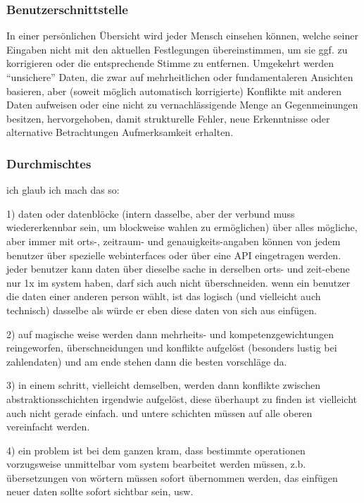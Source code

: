\subsubsection{Benutzerschnittstelle}

In einer persönlichen Übersicht wird jeder Mensch einsehen können, welche seiner Eingaben nicht mit den aktuellen Festlegungen übereinstimmen, um sie ggf. zu korrigieren oder die entsprechende Stimme zu entfernen. Umgekehrt werden "`unsichere"' Daten, die zwar auf mehrheitlichen oder fundamentaleren Ansichten basieren, aber (soweit möglich automatisch korrigierte) Konflikte mit anderen Daten aufweisen oder eine nicht zu vernachlässigende Menge an Gegenmeinungen besitzen, hervorgehoben, damit strukturelle Fehler, neue Erkenntnisse oder alternative Betrachtungen Aufmerksamkeit erhalten.

\subsubsection{Durchmischtes}

ich glaub ich mach das so:

1) daten oder datenblöcke (intern dasselbe, aber der verbund muss wiedererkennbar sein, um blockweise wahlen zu ermöglichen) über alles mögliche, aber immer mit orts-, zeitraum- und genauigkeits-angaben können von jedem benutzer über spezielle webinterfaces oder über eine API eingetragen werden. jeder benutzer kann daten über dieselbe sache in derselben orts- und zeit-ebene nur 1x im system haben, darf sich auch nicht überschneiden. wenn ein benutzer die daten einer anderen person wählt, ist das logisch (und vielleicht auch technisch) dasselbe als würde er eben diese daten von sich aus einfügen.

2) auf magische weise werden dann mehrheits- und kompetenzgewichtungen reingeworfen, überschneidungen und konflikte aufgelöst (besonders lustig bei zahlendaten) und am ende stehen dann die besten vorschläge da.

3) in einem schritt, vielleicht demselben, werden dann konflikte zwischen abstraktionsschichten irgendwie aufgelöst, diese überhaupt zu finden ist vielleicht auch nicht gerade einfach. und untere schichten müssen auf alle oberen vereinfacht werden.

4) ein problem ist bei dem ganzen kram, dass bestimmte operationen vorzugsweise unmittelbar vom system bearbeitet werden müssen, z.b. übersetzungen von wörtern müssen sofort übernommen werden, das einfügen neuer daten sollte sofort sichtbar sein, usw.


